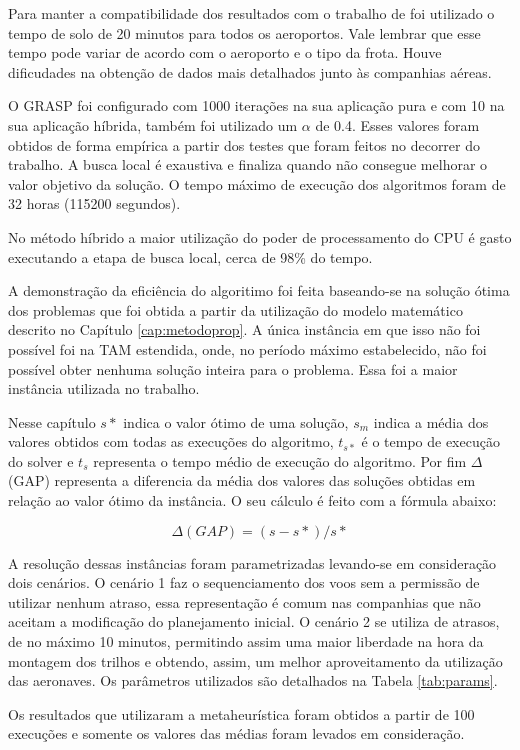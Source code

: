 Para manter a compatibilidade dos resultados com o trabalho de
\cite{pontes2002} foi utilizado o tempo de solo de 20 minutos para todos os
aeroportos. Vale lembrar que esse tempo pode variar de acordo com o aeroporto e
o tipo da frota. Houve dificudades na obtenção de dados mais detalhados junto
às companhias aéreas.

O GRASP foi configurado com 1000 iterações na sua aplicação pura e com 10 na
sua aplicação híbrida, também foi utilizado um $\alpha$ de 0.4. Esses valores
foram obtidos de forma empírica a partir dos testes que foram feitos no decorrer do trabalho. A
busca local é exaustiva e finaliza quando não consegue melhorar o valor
objetivo da solução. O tempo máximo de execução dos algoritmos foram de 32 horas
(115200 segundos).

No método híbrido a maior utilização do poder de processamento do CPU é
gasto executando a etapa de busca local, cerca de 98\% do tempo. 

A demonstração da eficiência do algoritimo foi feita baseando-se na solução
ótima dos problemas que foi obtida a partir da utilização do modelo
matemático descrito no Capítulo \ref{cap:metodoprop}. A única
instância em que isso não foi possível foi na TAM estendida, onde, no período
máximo estabelecido, não foi possível obter nenhuma solução inteira para o
problema. Essa foi a maior instância utilizada no trabalho.

Nesse capítulo $s*$ indica o valor ótimo de uma solução, $s_{m}$ indica a média
dos valores obtidos com todas as execuções do algoritmo, $t_{s*}$ é o
tempo de execução do solver e $t_{s}$ representa o tempo médio de execução do
algoritmo. Por fim $\Delta$ (GAP) representa a diferencia da média dos valores
das soluções obtidas em relação ao valor ótimo da instância. O seu cálculo é
feito com a fórmula abaixo:

\[  \Delta (GAP) = (s - s*)/s* \]

A resolução dessas instâncias foram parametrizadas levando-se em consideração
dois cenários. O cenário 1 faz o sequenciamento dos voos sem a permissão de utilizar
nenhum atraso, essa representação é comum nas companhias que não aceitam a
modificação do planejamento inicial. O cenário 2 se utiliza de atrasos, de no
máximo 10 minutos, permitindo assim uma maior liberdade na hora da montagem dos
trilhos e obtendo, assim, um melhor aproveitamento da utilização das aeronaves.
Os parâmetros utilizados são detalhados na Tabela \ref{tab:params}.

Os resultados que utilizaram a metaheurística foram obtidos a partir de 100
execuções e somente os valores das médias foram levados em consideração.


